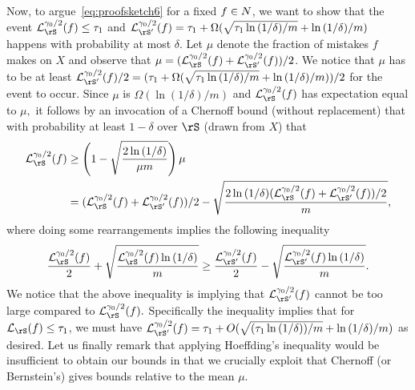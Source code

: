Now, to argue~\cref{eq:proofsketch6} for a fixed $ f \in N$, we want to show that the event $ \ls_{\rS}^{\gamma_{0}/2}(f)\leq \tau_{1} $ and $ \ls_{\rS'}^{\gamma_{0}/2}(f) = \tau_{1}+\Omega(\sqrt{\tau_{1}\ln{\left(1/\delta \right)}/m}+\ln{\left(1/\delta \right)}/m) $ happens with probability at most $ \delta$. Let $\mu$ denote the fraction of mistakes $ f $ makes on $ X $ and observe that $\mu= (\ls_{\rS}^{\gamma_{0}/2}(f)+\ls_{\rS'}^{\gamma_{0}/2}(f))/2$. We notice that $ \mu $ has to be at least $ \ls_{\rS'}^{\gamma_{0}/2}(f)/2 = (\tau_{1}+\Omega(\sqrt{\tau_{1}\ln{\left(1/\delta \right)}/m}+\ln{\left(1/\delta \right)}/m))/2 $ for the event to occur. Since $ \mu $ is $ \Omega(\ln{\left( 1/\delta\right)}/m) $ and $ \ls_{\rS}^{\gamma_{0}/2}(f) $ has expectation equal to $ \mu,$ it follows by an invocation of a Chernoff bound (without replacement) that with probability at least $ 1-\delta $ over $ \rS $ (drawn from $ X $)  that
 \begin{align*}
   \ls_{\rS}^{\gamma_{0}/2}(f)&\geq \left(1-\sqrt{\frac{2\ln{\left(1/\delta \right)}}{\mu m}}\right)\mu\\
   &=(\ls_{\rS}^{\gamma_{0}/2}(f)+\ls_{\rS'}^{\gamma_{0}/2}(f))/2-\sqrt{\frac{2\ln{\left(1/\delta \right)}(\ls_{\rS}^{\gamma_{0}/2}(f)+\ls_{\rS'}^{\gamma_{0}/2}(f))/2}{m}}, 
 \end{align*}    
where doing some rearrangements implies the following inequality
 \begin{align*}
  \frac{\ls_{\rS}^{\gamma_{0}/2}(f)}{2}+\sqrt{\frac{\ls_{\rS}^{\gamma_{0}/2}(f)\ln{\left(1/\delta \right)}}{m}}\geq \frac{\ls_{\rS'}^{\gamma_{0}/2}(f)}{2}-\sqrt{\frac{\ls_{\rS'}^{\gamma_{0}/2}(f)\ln{\left(1/\delta \right)}}{m}}.
 \end{align*}
We notice that the above inequality is implying that $ \ls_{\rS'}^{\gamma_{0}/2}(f) $ cannot be too large compared to $ \ls_{\rS}^{\gamma_{0}/2}(f).$ Specifically the inequality implies that for $ \ls_{\rS}(f)\leq \tau_{1} $, we must have $ \ls_{\rS'}^{\gamma_{0}/2}(f)= \tau_{1}+O(\sqrt{(\tau_{1}\ln{\left(1/\delta \right)})/m}+\ln{\left(1/\delta \right)}/m)$ as desired. Let us finally remark that applying Hoeffding's inequality would be insufficient to obtain our bounds in that we crucially exploit that Chernoff (or Bernstein's) gives bounds relative to the mean $\mu$.
